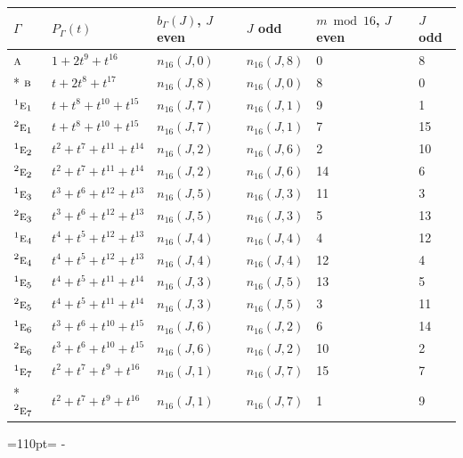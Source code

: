 \documentclass[10pt,a4paper]{article}
\newcommand{\needspace}[1]{\par\penalty-100\begingroup\dimen0=#1\relax\dimen2=\pagegoal
  \advance\dimen2-\pagetotal\ifdim\dimen0>\dimen2\relax\ifdim\dimen2>0pt\vfil\break\fi\fi
  \endgroup}
\numberwithin{equation}{section}
\newcommand{\irr}[1]{\text{\normalfont\scshape #1}}
\newcommand{\conjpair}[1]{{}^{#1}}
\begin{document}
{\small\begin{longtable}{@{}llllll@{}}\toprule
$\Gamma$ & $P_\Gamma(t)$ & $b_\Gamma(J)$, $J$ even & $J$ odd & $m \bmod 16$, $J$ even & $J$ odd\\\midrule\endhead
\bottomrule\endfoot\endlastfoot
$\irr{a}$ & $1 + 2t^{9} + t^{16}$ & $n_{16}(J,0)$ & $n_{16}(J,8)$ & 0 & 8\\*
$\irr{b}$ & $t + 2t^{8} + t^{17}$ & $n_{16}(J,8)$ & $n_{16}(J,0)$ & 8 & 0\\
$\conjpair{1}\irr{e}_{1}$ & $t + t^{8} + t^{10} + t^{15}$ & $n_{16}(J,7)$ & $n_{16}(J,1)$ & 9 & 1\\
$\conjpair{2}\irr{e}_{1}$ & $t + t^{8} + t^{10} + t^{15}$ & $n_{16}(J,7)$ & $n_{16}(J,1)$ & 7 & 15\\
$\conjpair{1}\irr{e}_{2}$ & $t^{2} + t^{7} + t^{11} + t^{14}$ & $n_{16}(J,2)$ & $n_{16}(J,6)$ & 2 & 10\\
$\conjpair{2}\irr{e}_{2}$ & $t^{2} + t^{7} + t^{11} + t^{14}$ & $n_{16}(J,2)$ & $n_{16}(J,6)$ & 14 & 6\\
$\conjpair{1}\irr{e}_{3}$ & $t^{3} + t^{6} + t^{12} + t^{13}$ & $n_{16}(J,5)$ & $n_{16}(J,3)$ & 11 & 3\\
$\conjpair{2}\irr{e}_{3}$ & $t^{3} + t^{6} + t^{12} + t^{13}$ & $n_{16}(J,5)$ & $n_{16}(J,3)$ & 5 & 13\\
$\conjpair{1}\irr{e}_{4}$ & $t^{4} + t^{5} + t^{12} + t^{13}$ & $n_{16}(J,4)$ & $n_{16}(J,4)$ & 4 & 12\\
$\conjpair{2}\irr{e}_{4}$ & $t^{4} + t^{5} + t^{12} + t^{13}$ & $n_{16}(J,4)$ & $n_{16}(J,4)$ & 12 & 4\\
$\conjpair{1}\irr{e}_{5}$ & $t^{4} + t^{5} + t^{11} + t^{14}$ & $n_{16}(J,3)$ & $n_{16}(J,5)$ & 13 & 5\\
$\conjpair{2}\irr{e}_{5}$ & $t^{4} + t^{5} + t^{11} + t^{14}$ & $n_{16}(J,3)$ & $n_{16}(J,5)$ & 3 & 11\\
$\conjpair{1}\irr{e}_{6}$ & $t^{3} + t^{6} + t^{10} + t^{15}$ & $n_{16}(J,6)$ & $n_{16}(J,2)$ & 6 & 14\\
$\conjpair{2}\irr{e}_{6}$ & $t^{3} + t^{6} + t^{10} + t^{15}$ & $n_{16}(J,6)$ & $n_{16}(J,2)$ & 10 & 2\\
$\conjpair{1}\irr{e}_{7}$ & $t^{2} + t^{7} + t^{9} + t^{16}$ & $n_{16}(J,1)$ & $n_{16}(J,7)$ & 15 & 7\\*
$\conjpair{2}\irr{e}_{7}$ & $t^{2} + t^{7} + t^{9} + t^{16}$ & $n_{16}(J,1)$ & $n_{16}(J,7)$ & 1 & 9\\
\bottomrule\end{longtable}}
\needspace{110pt}
\end{document}
